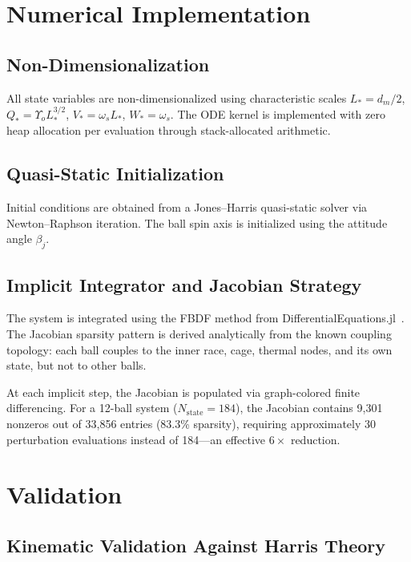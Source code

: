 \documentclass[machines,article,submit,pdftex,moreauthors]{Definitions/mdpi}
\begin{document}
\section{Numerical Implementation}
\label{sec:numerical}

\subsection{Non-Dimensionalization}

All state variables are non-dimensionalized using characteristic scales $L_* = d_m/2$, $Q_* = \Upsilon_o L_*^{3/2}$, $V_* = \omega_s L_*$, $W_* = \omega_s$. The ODE kernel is implemented with zero heap allocation per evaluation through stack-allocated arithmetic.

\subsection{Quasi-Static Initialization}

Initial conditions are obtained from a Jones--Harris quasi-static solver via Newton--Raphson iteration. The ball spin axis is initialized using the attitude angle $\beta_j$.

\subsection{Implicit Integrator and Jacobian Strategy}

The system is integrated using the FBDF method from DifferentialEquations.jl~\cite{Rackauckas2017}. The Jacobian sparsity pattern is derived analytically from the known coupling topology: each ball couples to the inner race, cage, thermal nodes, and its own state, but not to other balls.

At each implicit step, the Jacobian is populated via graph-colored finite differencing. For a 12-ball system ($N_{\text{state}} = 184$), the Jacobian contains 9,301 nonzeros out of 33,856 entries (83.3\% sparsity), requiring approximately 30 perturbation evaluations instead of 184---an effective $6\times$ reduction.


\section{Validation}
\label{sec:validation}

\subsection{Kinematic Validation Against Harris Theory}
\end{document}
